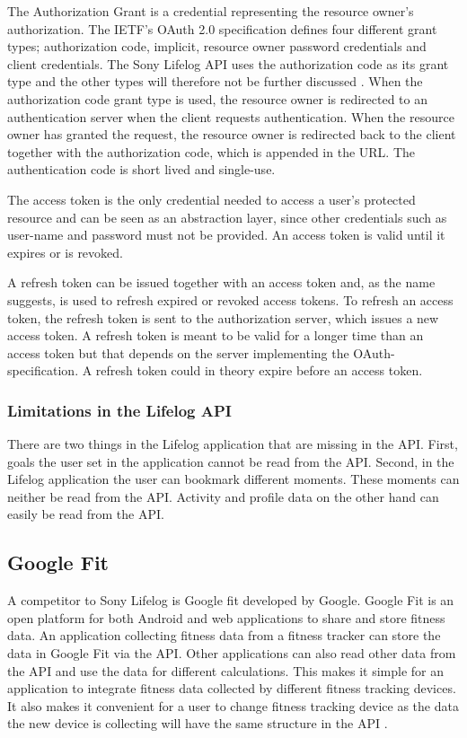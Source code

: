\documentclass{cslthse-msc}
\begin{document}

The Authorization Grant is a credential representing the resource owner's authorization. The IETF's OAuth 2.0 specification defines four different grant types; authorization code, implicit, resource owner password credentials and client credentials. The Sony Lifelog API uses the authorization code as its grant type and the other types will therefore not be further discussed \cite{LifeLogAuth}. When the authorization code grant type is used, the resource owner is redirected to an authentication server when the client requests authentication. When the resource owner has granted the request, the resource owner is redirected back to the client together with the authorization code, which is appended in the URL. The authentication code is short lived and single-use.

The access token is the only credential needed to access a user's protected resource and can be seen as an abstraction layer, since other credentials such as user-name and password must not be provided. An access token is valid until it expires or is revoked.  

A refresh token can be issued together with an access token and, as the name suggests, is used to refresh expired or revoked access tokens. To refresh an access token, the refresh token is sent to the authorization server, which issues a new access token. A refresh token is meant to be valid for a longer time than an access token but that depends on the server implementing the OAuth-specification. A refresh token could in theory expire before an access token. 
 
 
 \subsubsection{Limitations in the Lifelog API}
There are two things in the Lifelog application that are missing in the API. First, goals the user set in the application cannot be read from the API. Second, in the Lifelog application the user can bookmark different moments. These moments can neither be read from the API. Activity and profile data on the other hand can easily be read from the API. %

\subsection{Google Fit}
A competitor to Sony Lifelog is Google fit developed by Google. Google Fit is an open platform for both Android and web applications to share and store fitness data. An application collecting fitness data from a fitness tracker can store the data in Google Fit via the API. Other applications can also read other data from the API and use the data for different calculations. This makes it simple for an application to integrate fitness data collected by different fitness tracking devices. It also makes it convenient for a user to change fitness tracking device as the data the new device is collecting will have the same structure in the API \cite{GoogleFitOverview}. 
\end{document}
